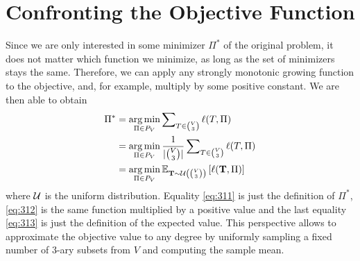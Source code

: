 \section{Confronting the Objective Function}
Since we are only interested in some minimizer $\Pi^*$ of the original problem, it does not matter which function we minimize, as long as the set of minimizers stays the same. Therefore, we can apply any strongly monotonic growing function to the objective, and, for example, multiply by some positive constant. We are then able to obtain
\begin{align}
    \Pi^* &= \operatorname*{\arg\min}_{\Pi \in P_V} \sum\nolimits_{T\in\binom{V}{3}} \ell(T,\Pi) \label{eq:311} \\
    &= \operatorname*{\arg\min}_{\Pi \in P_V} \frac{1}{|\binom{V}{3}|} \sum\nolimits_{T\in\binom{V}{3}} \ell(T,\Pi) \label{eq:312} \\
    &= \operatorname*{\arg\min}_{\Pi \in P_V} \mathbb{E}_{{\bf T} \sim \mathcal{U}\left(\binom{V}{3}\right)} \left[\ell({\bf T}, \Pi)\right] \label{eq:313}
\end{align}
where $\mathcal{U}$ is the uniform distribution. Equality \eqref{eq:311} is just the definition of $\Pi^*$, \eqref{eq:312} is the same function multiplied by a positive value and the last equality \eqref{eq:313} is just the definition of the expected value. This perspective allows to approximate the objective value to any degree by uniformly sampling a fixed number of $3$-ary subsets from $V$ and computing the sample mean.

